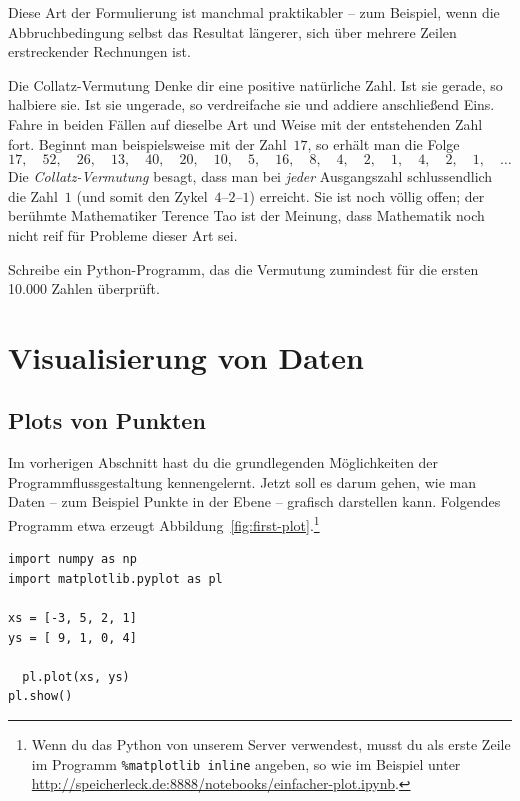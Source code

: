 \documentclass{blatt}
\begin{document}
Diese Art der Formulierung ist manchmal praktikabler -- zum Beispiel, wenn die
Abbruchbedingung selbst das Resultat längerer, sich über mehrere Zeilen
erstreckender Rechnungen ist.

\begin{aufgabe}{Die Collatz-Vermutung}
Denke dir eine positive natürliche Zahl. Ist sie gerade, so halbiere sie. Ist
sie ungerade, so verdreifache sie und addiere anschließend Eins. Fahre in
beiden Fällen auf dieselbe Art und Weise mit der entstehenden Zahl fort.
Beginnt man beispielsweise mit der Zahl~$17$, so erhält man die Folge
\[ 17,\quad52,\quad26,\quad13,\quad40,\quad20,\quad10,\quad5,\quad16,\quad8,\quad4,\quad2,\quad1,\quad4,\quad2,\quad1,\quad\ldots \]
Die \emph{Collatz-Vermutung} besagt, dass man bei \emph{jeder} Ausgangszahl
schlussendlich die Zahl~$1$ (und somit den Zykel~$4$--$2$--$1$) erreicht. Sie
ist noch völlig offen; der berühmte Mathematiker Terence Tao ist der Meinung,
dass Mathematik noch nicht reif für Probleme dieser Art sei.

Schreibe ein Python-Programm, das die Vermutung zumindest für die ersten
10.000 Zahlen überprüft.
\end{aufgabe}


\section{Visualisierung von Daten}

\subsection{Plots von Punkten}

Im vorherigen Abschnitt hast du die grundlegenden Möglichkeiten der
Programmflussgestaltung kennengelernt. Jetzt soll es darum gehen, wie man Daten
-- zum Beispiel Punkte in der Ebene -- grafisch darstellen kann. Folgendes
Programm etwa erzeugt Abbildung~\ref{fig:first-plot}.\footnote{Wenn du das
Python von unserem Server verwendest, musst du als erste Zeile im Programm
\texttt{\%matplotlib inline} angeben, so wie im Beispiel unter
\url{http://speicherleck.de:8888/notebooks/einfacher-plot.ipynb}.}

\begin{verbatim}
import numpy as np
import matplotlib.pyplot as pl

xs = [-3, 5, 2, 1]
ys = [ 9, 1, 0, 4]

  pl.plot(xs, ys)
pl.show()
  \end{verbatim}
\end{document}

